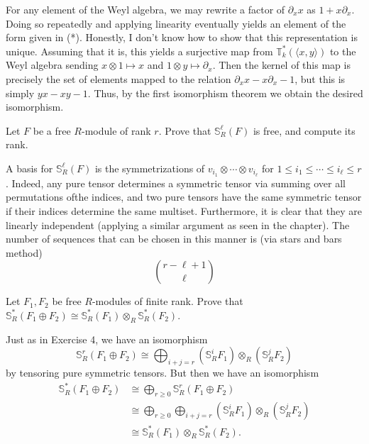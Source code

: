 \documentclass[../../master.tex]{subfiles}
\begin{document}
\begin{solution}
    For any element of the Weyl algebra, we may rewrite a factor of $\partial_x x$ as $ 1 + x \partial_x$.
    Doing so repeatedly and applying linearity eventually yields an element of the form given in (*).
    Honestly, I don't know how to show that this representation is unique.
    Assuming that it is, this yields a surjective map from $\mathbb{T}_k^{*}(\langle x, y \rangle)$ to the Weyl algebra sending $x \otimes 1 \mapsto x$ and $1 \otimes y \mapsto \partial_x$.
    Then the kernel of this map is precisely the set of elements mapped to the relation $\partial_x x - x \partial_x - 1$, but this is simply $yx - xy - 1$.
    Thus, by the first isomorphism theorem we obtain the desired isomorphism.
\end{solution}

\begin{problem}
    Let $F$ be a free $R$-module of rank $r$.
    Prove that $\mathbb{S}_R^{\ell}(F)$ is free, and compute its rank.
\end{problem}

\begin{solution}
    A basis for $\mathbb{S}_R^{\ell}(F)$ is the symmetrizations of $v_{i_1} \otimes \cdots \otimes v_{i_\ell}$ for $1 \leq i_1 \leq \cdots \leq i_\ell \leq r$.
    Indeed, any pure tensor determines a symmetric tensor via summing over all permutations ofthe indices, and two pure tensors have the same symmetric tensor if their indices determine the same multiset.
    Furthermore, it is clear that they are linearly independent (applying a similar argument as seen in the chapter).
    The number of sequences that can be chosen in this manner is (via stars and bars method)
    \[
    {r - \ell + 1} \choose \ell
    \]
\end{solution}

\begin{problem}
    Let $F_1, F_2$ be free $R$-modules of finite rank.
    Prove that $\mathbb{S}_R^{*}(F_1 \oplus F_2) \cong \mathbb{S}_R^{*}(F_1) \otimes_R \mathbb{S}_R^{*}(F_2)$.
\end{problem}

\begin{solution}
    Just as in Exercise 4, we have an isomorphism
    \[
    \mathbb{S}_R^{r}(F_1 \oplus F_2) \cong \bigoplus_{i + j = r} (\mathbb{S}_R^{i} F_1) \otimes_R (\mathbb{S}_R^{j} F_2)
    \]
    by tensoring pure symmetric tensors.
    But then we have an isomorphism
    \begin{align*}
        \mathbb{S}_R^{*}(F_1 \oplus F_2) &\cong \bigoplus_{r \geq 0} \mathbb{S}_R^{r}(F_1 \oplus F_2) \\
                                         &\cong \bigoplus_{r \geq 0} \bigoplus_{i+j=r} (\mathbb{S}_R^{i} F_1) \otimes_R (\mathbb{S}_R^{j} F_2) \\
                                         &\cong \mathbb{S}_R^{*}(F_1) \otimes_R \mathbb{S}_R^{*}(F_2).
    \end{align*}
\end{solution}
\end{document}

